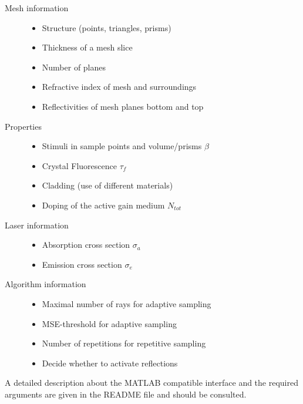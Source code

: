 \begin{description}
\label{label:input}
  \item[Mesh information]\mbox{}
    \begin{itemize}
      \setlength{\itemindent}{-2.5em}
    \item Structure (points, triangles, prisms)
    \item Thickness of a mesh slice
    \item Number of planes
    \item Refractive index of mesh and surroundings
    \item Reflectivities of mesh planes bottom and top
    \end{itemize}

  \item[Properties] \mbox{}
    \begin{itemize}
      \setlength{\itemindent}{-2.5em}
      \item Stimuli in sample points and volume/prisms $\beta$
      \item Crystal Fluorescence $\tau_{f}$
      \item Cladding (use of different materials)
      \item Doping of the active gain medium $N_{tot}$
    \end{itemize}

  \item[Laser information] \mbox{}
    \begin{itemize}
      \setlength{\itemindent}{-2.5em}
      \item Absorption cross section $\sigma_a$
      \item Emission cross section $\sigma_e$
    \end{itemize}

   \item[Algorithm information] \mbox{}
    \begin{itemize}
      \setlength{\itemindent}{-2.5em}
       \item Maximal number of rays for adaptive sampling
       \item MSE-threshold for adaptive sampling
       \item Number of repetitions for repetitive sampling
       \item Decide whether to activate reflections
     \end{itemize}
    
 \end{description}
A detailed description about the MATLAB compatible interface and the
required arguments are given in the README file and should be
consulted.

